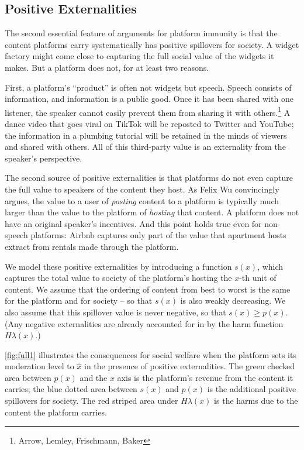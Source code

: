 \subsection{Positive Externalities}

The second essential feature of arguments for platform immunity is that the content platforms carry systematically has positive spillovers for society. A widget factory might come close to capturing the full social value of the widgets it makes. But a platform does not, for at least two reasons.

First, a platform's ``product'' is often not widgets but speech. Speech consists of information, and information is a public good. Once it has been shared with one listener, the speaker cannot easily prevent them from sharing it with others.\footnote{Arrow, Lemley, Frischmann, Baker} A dance video that goes viral on TikTok will be reposted to Twitter and YouTube; the information in a plumbing tutorial will be retained in the minds of viewers and shared with others. All of this third-party value is an externality from the speaker's perspective.

The second source of positive externalities is that platforms do not even capture the full value to speakers of the content they host. As Felix Wu convincingly argues, the value to a user of \emph{posting} content to a platform is typically much larger than the value to the platform of \emph{hosting} that content. A platform does not have an original speaker's incentives. And this point holds true even for non-speech platforms: Airbnb captures only part of the value that apartment hosts extract from rentals made through the platform.

We model these positive externalities by introducing a function $s(x)$, which captures the total value to society of the platform's hosting the $x$-th unit of content. We assume that the ordering of content from best to worst is the same for the platform and for society -- so that $s(x)$ is also weakly decreasing. We also assume that this spillover value is never negative, so that $s(x) \ge p(x)$. (Any negative externalities are already accounted for in by the harm function $H\lambda(x)$.)

\autoref{fig:full1} illustrates the consequences for social welfare when the platform sets its moderation level to $\hat{x}$ in the presence of positive externalities. The green checked area between $p(x)$ and the $x$ axis is the platform's revenue from the content it carries; the blue dotted area between $s(x)$ and $p(x)$ is the additional positive spillovers for society. The red striped area under $H\lambda(x)$ is the harms due to the content the platform carries.

